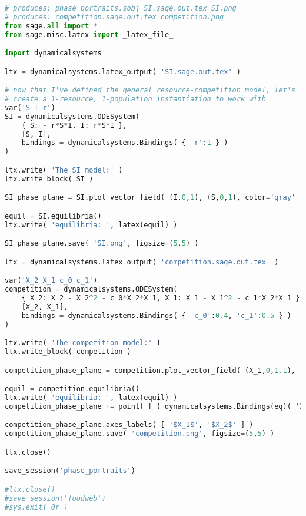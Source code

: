 \begin{lstlisting}[language=Python]
# produces: phase_portraits.sobj SI.sage.out.tex SI.png
# produces: competition.sage.out.tex competition.png
from sage.all import * 
from sage.misc.latex import _latex_file_

import dynamicalsystems

ltx = dynamicalsystems.latex_output( 'SI.sage.out.tex' )

# now that I've defined the general resource-competition model, let's
# create a 1-resource, 1-population instantiation to work with
var('S I r')
SI = dynamicalsystems.ODESystem(
	{ S: - r*S*I, I: r*S*I },
	[S, I],
	bindings = dynamicalsystems.Bindings( { 'r':1 } )
)

ltx.write( 'The SI model:' )
ltx.write_block( SI )

SI_phase_plane = SI.plot_vector_field( (I,0,1), (S,0,1), color='gray' )

equil = SI.equilibria()
ltx.write( 'equilibria: ', latex(equil) )

SI_phase_plane.save( 'SI.png', figsize=(5,5) )

ltx = dynamicalsystems.latex_output( 'competition.sage.out.tex' )

var('X_2 X_1 c_0 c_1')
competition = dynamicalsystems.ODESystem(
	{ X_2: X_2 - X_2^2 - c_0*X_2*X_1, X_1: X_1 - X_1^2 - c_1*X_2*X_1 },
	[X_2, X_1],
	bindings = dynamicalsystems.Bindings( { 'c_0':0.4, 'c_1':0.5 } )
)

ltx.write( 'The competition model:' )
ltx.write_block( competition )

competition_phase_plane = competition.plot_vector_field( (X_1,0,1.1), (X_2,0,1.1), color='gray' )

equil = competition.equilibria()
ltx.write( 'equilibria: ', latex(equil) )
competition_phase_plane += point( [ ( dynamicalsystems.Bindings(eq)( 'Xhat_1' ), dynamicalsystems.Bindings(eq)( 'Xhat_2' ) ) for eq in equil ], size=40 )

competition_phase_plane.axes_labels( [ '$X_1$', '$X_2$' ] )
competition_phase_plane.save( 'competition.png', figsize=(5,5) )

ltx.close()

save_session('phase_portraits')

#ltx.close()
#save_session('foodweb')
#sys.exit( 0r )
\end{lstlisting}
